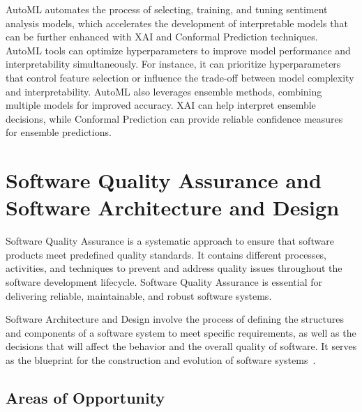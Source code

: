 \documentclass{article}
\begin{document}
AutoML automates the process of selecting, training, and tuning sentiment analysis models, which accelerates the development of interpretable models that can be further enhanced with XAI and Conformal Prediction techniques. AutoML tools can optimize hyperparameters to improve model performance and interpretability simultaneously. For instance, it can prioritize hyperparameters that control feature selection or influence the trade-off between model complexity and interpretability. AutoML also leverages ensemble methods, combining multiple models for improved accuracy. XAI can help interpret ensemble decisions, while Conformal Prediction can provide reliable confidence measures for ensemble predictions.

\section{Software Quality Assurance and Software Architecture and Design}

Software Quality Assurance is a systematic approach to ensure that software products meet predefined quality standards. It contains different processes, activities, and techniques to prevent and address quality issues throughout the software development lifecycle. Software Quality Assurance is essential for delivering reliable, maintainable, and robust software systems.

Software Architecture and Design involve the process of defining the structures and components of a software system to meet specific requirements, as well as the decisions that will affect the behavior and the overall quality of software. It serves as the blueprint for the construction and evolution of software systems~\cite{ARCHITECTURE, software_architecture_wan}.

\subsection{Areas of Opportunity}
\end{document}
